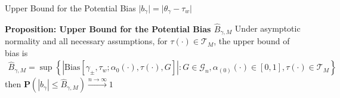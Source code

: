  \begin{frame}{Upper Bound for the Potential Bias $ \lvert b_{\gamma} \rvert = \lvert \theta_{\gamma}-\tau_{w} \rvert$}
    
    \begin{block}{\textbf{Proposition: Upper Bound for the Potential Bias $\hat{B}_{\gamma,M}$}}
        \small
        Under asymptotic normality and all necessary assumptions, for $\tau(\cdot)\in \mathcal{T}_M$, the upper bound of bias is
        \begin{align*}
            \hat{B}_{\gamma,M}=\sup\left\{ \left|\mathrm{Bias}\left[\gamma_{\pm},\tau_{w};\alpha_{0}\left(\cdot\right),\tau\left(\cdot\right),G\right]\right|:G\in\mathcal{G}_{n},\alpha_{\left(0\right)}\left(\cdot\right)\in\left[0,1\right],\tau\left(\cdot\right)\in\mathcal{T}_{M}\right\} 
        \end{align*}
        then $\mathbf{P}\left(\left|b_{\gamma}\right|\leq\hat{B}_{\gamma,M}\right)\xrightarrow{n\rightarrow\infty}1$
        
    \end{block}

 \end{frame}

